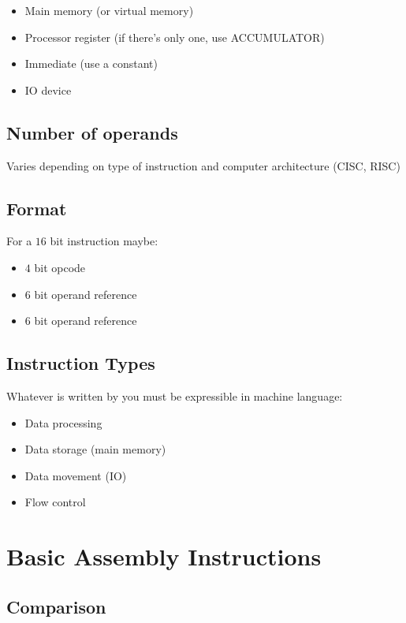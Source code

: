 \begin{itemize}
    \item Main memory (or virtual memory)
    \item Processor register (if there's only one, use ACCUMULATOR)
    \item Immediate (use a constant)
    \item IO device
\end{itemize}

\subsection{Number of operands}\label{sub:number_of_operands}

Varies depending on type of instruction and computer architecture (CISC, RISC)

\subsection{Format}\label{sub:format}

For a \(16\) bit instruction maybe:
\begin{itemize}
    \item \(4\) bit opcode
    \item \(6\) bit operand reference
    \item \(6\) bit operand reference
\end{itemize}

\subsection{Instruction Types}\label{sub:instruction_types}

Whatever is written by you must be expressible in machine language:
\begin{itemize}
    \item Data processing
    \item Data storage (main memory)
    \item Data movement (IO)
    \item Flow control
\end{itemize}

\section{Basic Assembly Instructions}\label{sec:basic_assembly_instructions}

\subsection{Comparison}\label{sub:comparison}

